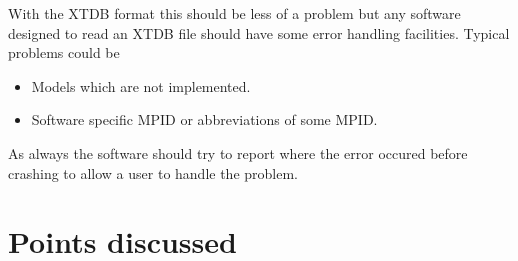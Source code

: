 \documentclass{article}
\begin{document}
With the XTDB format this should be less of a problem but any software
designed to read an XTDB file should have some error handling
facilities.  Typical problems could be

\begin{itemize}
\item Models which are not implemented.
\item Software specific MPID or abbreviations of some MPID.
\end{itemize}

As always the software should try to report where the error occured
before crashing to allow a user to handle the problem.

\section{Points discussed}\label{sec:points}
\end{document}
